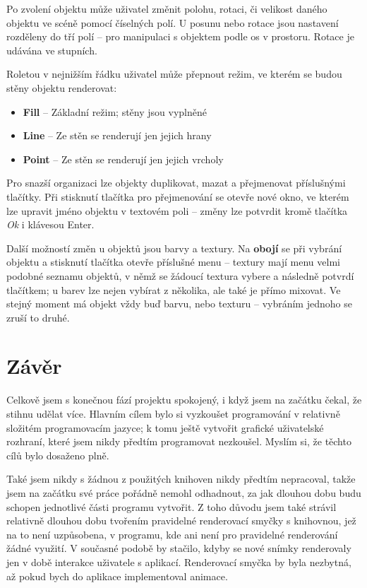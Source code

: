 \documentclass[a4paper, 11pt]{report}
\begin{document}
Po zvolení objektu může uživatel změnit polohu, rotaci, či velikost daného objektu ve scéně pomocí číselných polí. U posunu nebo rotace jsou nastavení rozděleny do tří polí -- pro manipulaci s objektem podle os v prostoru. Rotace je udávána ve stupních.

\begin{minipage}{\textwidth}
Roletou v nejnižším řádku uživatel může přepnout režim, ve kterém se budou stěny objektu renderovat:
\begin{itemize}
    \item \textbf{Fill} -- Základní režim; stěny jsou vyplněné
    \item \textbf{Line} -- Ze stěn se renderují jen jejich hrany
    \item \textbf{Point} -- Ze stěn se renderují jen jejich vrcholy
\end{itemize}
\end{minipage}

Pro snazší organizaci lze objekty duplikovat, mazat a přejmenovat příslušnými tlačítky. Při stisknutí tlačítka pro přejmenování se otevře nové okno, ve kterém lze upravit jméno objektu v textovém poli -- změny lze potvrdit kromě tlačítka \emph{Ok} i klávesou Enter.

Další možností změn u objektů jsou barvy a textury. Na \textbf{obojí} se při vybrání objektu a stisknutí tlačítka otevře příslušné menu -- textury mají menu velmi podobné seznamu objektů, v němž se žádoucí textura vybere a následně potvrdí tlačítkem; u barev lze nejen vybírat z několika, ale také je přímo mixovat. Ve stejný moment má objekt vždy buď barvu, nebo texturu -- vybráním jednoho se zruší to druhé.

\chapter{Závěr}
Celkově jsem s konečnou fází projektu spokojený, i když jsem na začátku čekal, že stihnu udělat více. Hlavním cílem bylo si vyzkoušet programování v relativně složitém programovacím jazyce; k tomu ještě vytvořit grafické uživatelské rozhraní, které jsem nikdy předtím programovat nezkoušel. Myslím si, že těchto cílů bylo dosaženo plně.

Také jsem nikdy s žádnou z použitých knihoven nikdy předtím nepracoval, takže jsem na začátku své práce pořádně nemohl odhadnout, za jak dlouhou dobu budu schopen jednotlivé části programu vytvořit. Z toho důvodu jsem také strávil relativně dlouhou dobu tvořením pravidelné renderovací smyčky s knihovnou, jež na to není uzpůsobena, v programu, kde ani není pro pravidelné renderování žádné využití. V současné podobě by stačilo, kdyby se nové snímky renderovaly jen v době interakce uživatele s aplikací. Renderovací smyčka by byla nezbytná, až pokud bych do aplikace implementoval animace.
\end{document}
